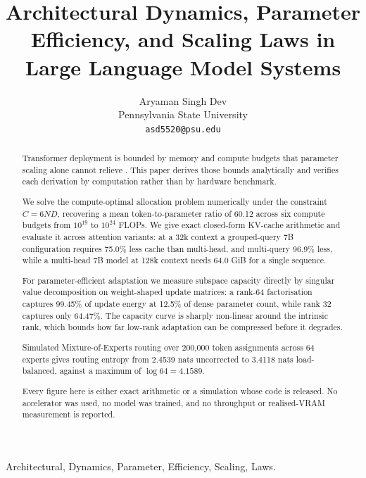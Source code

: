 \documentclass[10pt,journal,compsoc,twocolumn]{IEEEtran}
\begin{document}
\title{Architectural Dynamics, Parameter Efficiency, and Scaling Laws in Large Language Model Systems}

\author{
Aryaman Singh Dev\\
Pennsylvania State University \\
\texttt{asd5520@psu.edu}
}

\maketitle

\begin{abstract}
Transformer deployment is bounded by memory and compute budgets that parameter scaling alone cannot relieve \cite{arxiv_2005_14165,arxiv_2406_00584}. This paper derives those bounds analytically and verifies each derivation by computation rather than by hardware benchmark.

We solve the compute-optimal allocation problem numerically under the constraint $C = 6ND$, recovering a mean token-to-parameter ratio of 60.12 across six compute budgets from $10^{19}$ to $10^{24}$ FLOPs. We give exact closed-form KV-cache arithmetic and evaluate it across attention variants: at a 32k context a grouped-query 7B configuration requires 75.0\% less cache than multi-head, and multi-query 96.9\% less, while a multi-head 7B model at 128k context needs 64.0 GiB for a single sequence.

For parameter-efficient adaptation we measure subspace capacity directly by singular value decomposition on weight-shaped update matrices: a rank-64 factorisation captures 99.45\% of update energy at 12.5\% of dense parameter count, while rank 32 captures only 64.47\%. The capacity curve is sharply non-linear around the intrinsic rank, which bounds how far low-rank adaptation can be compressed before it degrades.

Simulated Mixture-of-Experts routing over 200{,}000 token assignments across 64 experts gives routing entropy from 2.4539 nats uncorrected to 3.4118 nats load-balanced, against a maximum of $\log 64 = 4.1589$.

Every figure here is either exact arithmetic or a simulation whose code is released. No accelerator was used, no model was trained, and no throughput or realised-VRAM measurement is reported.
\end{abstract}

\begin{IEEEkeywords}
Architectural, Dynamics, Parameter, Efficiency, Scaling, Laws.
\end{IEEEkeywords}
\end{document}
